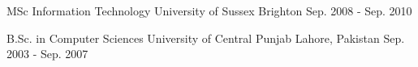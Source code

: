 
\begin{cventries}

  \cventry
  {MSc Information Technology} %
  {University of Sussex} %
  {Brighton} %
  {Sep. 2008 - Sep. 2010} %
  {} %

  \cventry
  {B.Sc. in Computer Sciences} %
  {University of Central Punjab} %
  {Lahore, Pakistan} %
  {Sep. 2003 - Sep. 2007} %
  {} %

\end{cventries}
